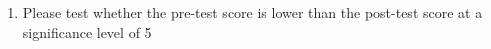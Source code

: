 \begin{enumerate}
	\item Please test whether the pre-test score is lower than the post-test score at a significance level of 5%
\end{enumerate}
